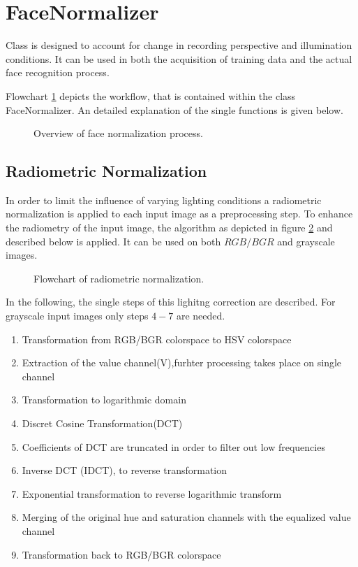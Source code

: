 \section{FaceNormalizer}
Class is designed to account for change in recording perspective and illumination conditions.
It can be used in both the acquisition of training data and the actual face recognition process.

Flowchart \ref{fc:FaceNorm} depicts the workflow, that is contained within the class FaceNormalizer.
An detailed explanation of the single functions is given below.


\begin{figure}
\centering
{}
\caption{Overview of face normalization process.}
\label{fc:FaceNorm}
\end{figure}

\subsection{Radiometric Normalization}

In order to limit the influence of varying lighting conditions a radiometric normalization is 
applied to each input image as a preprocessing step.
To enhance the radiometry of the input image, the algorithm as depicted in figure \ref{fc:RadNorm}
and described below is applied.
It can be used on both $RGB/BGR$ and grayscale images.

\begin{figure}
\centering
{}
\caption{Flowchart of radiometric normalization.}
\label{fc:RadNorm}
\end{figure}

In the following, the single steps of this lighitng correction are described. For grayscale input images
only steps $4-7$ are needed.
\begin{enumerate}
\item Transformation from RGB/BGR colorspace to HSV colorspace
\item Extraction of the value channel(V),furhter processing takes place on single channel
\item Transformation to logarithmic domain
\item Discret Cosine Transformation(DCT)
\item Coefficients of DCT are truncated in order to filter out low frequencies
\item Inverse DCT (IDCT), to reverse transformation
\item Exponential transformation to reverse logarithmic transform
\item Merging of the original hue and saturation channels with the equalized value channel
\item Transformation back to RGB/BGR colorspace
\end{enumerate}

